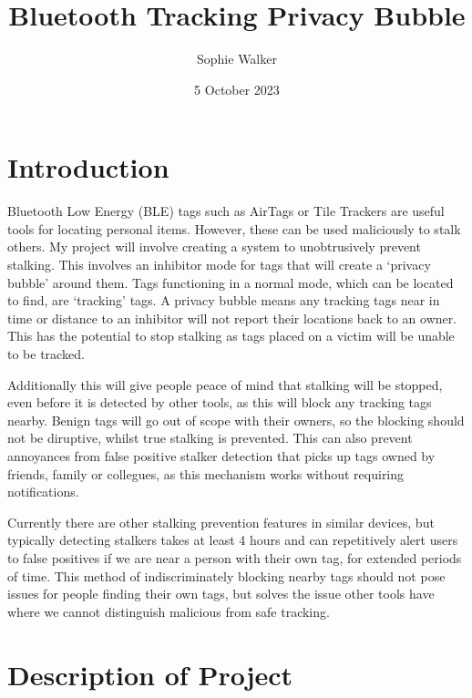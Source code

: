 \documentclass[12pt]{article}
\begin{document}
\title{Bluetooth Tracking Privacy Bubble}
\author{Sophie Walker}
\date{5 October 2023}
\maketitle
\thispagestyle{empty}
\section{Introduction}


Bluetooth Low Energy (BLE) tags such as AirTags or Tile Trackers are useful tools for locating personal items. However, these can be used maliciously to stalk others. My project will involve creating a system to unobtrusively prevent stalking. This involves an inhibitor mode for tags that will create a `privacy bubble' around them. Tags functioning in a normal mode, which can be located to find, are `tracking' tags. A privacy bubble means any tracking tags near in time or distance to an inhibitor will not report their locations back to an owner. This has the potential to stop stalking as tags placed on a victim will be unable to be tracked. 
\par

Additionally this will give people peace of mind that stalking will be stopped, even before it is detected by other tools, as this will block any tracking tags nearby. Benign tags will go out of scope with their owners, so the blocking should not be diruptive, whilst true stalking is prevented. This can also prevent annoyances from false positive stalker detection that picks up tags owned by friends, family or collegues, as this mechanism works without requiring notifications.
\par
Currently there are other stalking prevention features in similar devices, but typically detecting stalkers takes at least 4 hours \cite{Failuresof ASProtocols} and can repetitively alert users to false positives if we are near a person with their own tag, for extended periods of time. This method of indiscriminately blocking nearby tags should not pose issues for people finding their own tags,  but solves the issue other tools have where we cannot distinguish malicious from safe tracking. 


\section{Description of Project}
\end{document}
